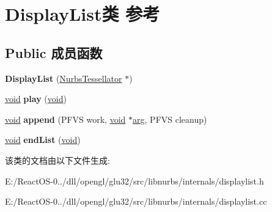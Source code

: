 \hypertarget{class_display_list}{}\section{Display\+List类 参考}
\label{class_display_list}
\subsection*{Public 成员函数}
\begin{DoxyCompactItemize}
\item 
\mbox{\label{class_display_list_a833d32b5a39dcf6dd0fa496a3e7e4549}} 
{\bfseries Display\+List} (\hyperlink{class_nurbs_tessellator}{Nurbs\+Tessellator} $\ast$)
\item 
\mbox{\label{class_display_list_a5f78cde952ac127af78850aeed8eb091}} 
\hyperlink{interfacevoid}{void} {\bfseries play} (\hyperlink{interfacevoid}{void})
\item 
\mbox{\label{class_display_list_ae970af6b2fd423fd9434dd286c2ce9ea}} 
\hyperlink{interfacevoid}{void} {\bfseries append} (P\+F\+VS work, \hyperlink{interfacevoid}{void} $\ast$\hyperlink{interfacevoid}{arg}, P\+F\+VS cleanup)
\item 
\mbox{\label{class_display_list_a3a638a405692bf571bde58001011620e}} 
\hyperlink{interfacevoid}{void} {\bfseries end\+List} (\hyperlink{interfacevoid}{void})
\end{DoxyCompactItemize}


该类的文档由以下文件生成\+:\begin{DoxyCompactItemize}
\item 
E\+:/\+React\+O\+S-\/0../dll/opengl/glu32/src/libnurbs/internals/displaylist.\+h\item 
E\+:/\+React\+O\+S-\/0../dll/opengl/glu32/src/libnurbs/internals/displaylist.\+cc\end{DoxyCompactItemize}
